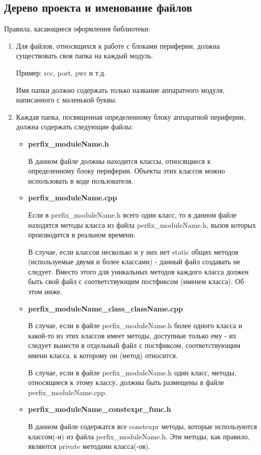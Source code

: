 \subsection{Дерево проекта и именование файлов}
\label{dn:0}
Правила, касающиеся оформления библиотеки:
\begin{enumerate}
	\item Для файлов, относящихся к работе с блоками периферии, должна существовать своя папка на каждый модуль.
	
	Пример: rcc, port, pwr и т.д.
	
	Имя папки должно содержать только название аппаратного модуля, написанного с маленькой буквы.
	\item Каждая папка, посвященная определенному блоку аппаратной периферии, должна содержать следующие файлы:
	\begin{itemize}
		\item \textbf{perfix\_moduleName.h}
		
		В данном файле должны находится классы, относящиеся к определенному блоку периферии. Объекты этих классов можно использовать в коде пользователя.
		\item \textbf{perfix\_moduleName.cpp}
		
		Если в perfix\_moduleName.h всего один класс, то в данном файле находятся методы класса из файла perfix\_moduleName.h, вызов которых производится в реальном времени. 
		
		В случае, если классов несколько и у них нет static общих методов (используемые двумя и более классами) - данный файл создавать не следует. Вместо этого для уникальных методов каждого класса должен быть свой файл с соответствующим постфиксом (именем класса). Об этом ниже.
		\item \textbf{perfix\_moduleName\_class\_className.cpp}
		
		В случае, если в файле perfix\_moduleName.h более одного класса и какой-то из этих классов имеет методы, доступные только ему - их следует вынести в отдельный файл с постфиксом, соответствующим имени класса, к которому он (метод) относится. 
		
		В случае, если в файле perfix\_moduleName.h один класс, методы, относящиеся к этому классу, должны быть размещены в файле perfix\_\-moduleName.cpp.
		
		\item \textbf{perfix\_moduleName\_constexpr\_func.h}
		
		В данном файле содержатся все constexpr методы, которые используются классом(-и) из файла perfix\_moduleName.h. Эти методы, как правило, являются private методами класса(-ов). 
		

\end{itemize}
\end{enumerate}
